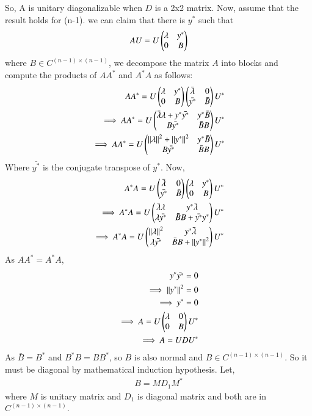\documentclass[journal,12pt,twocolumn]{IEEEtran}
\begin{document}
So, A is unitary diagonalizable when $D$ is a 2x2 matrix.
Now, assume that the result holds for (n-1). we can claim that there is $y^*$ such that 
\begin{align}
AU = U\begin{pmatrix}\lambda & y^*\\0 & B\end{pmatrix}
\end{align}
where $B \in C^{(n-1)\times(n-1)}$, we decompose the matrix $A$ into blocks and compute the products of $A A^*$ and $A^* A$ as follows:
\begin{align}
A A^* =  U \begin{pmatrix}\lambda & y^*\\0 & B\end{pmatrix}\begin{pmatrix}\bar{\lambda} & 0\\\bar{y^*} & \bar{B}\end{pmatrix}U^*\\
\implies A A^* =  U \begin{pmatrix}\bar{\lambda}\lambda + y^*\bar{y^*} & y^* \bar{B}\\B\bar{y^*} & \bar{B}B\end{pmatrix} U^*\\
\implies A A^* = U \begin{pmatrix}\left\lVert\lambda\right\rVert^2 + \left\lVert y^*\right\rVert^2 & y^* \bar{B}\\B\bar{y^*} & \bar{B}B\end{pmatrix} U^*
\end{align}
Where $\bar{y^*}$ is the conjugate transpose of $y^*$.
Now,
\begin{align}
A^* A = U \begin{pmatrix}\bar{\lambda} & 0\\\bar{y^*} & \bar{B}\end{pmatrix}\begin{pmatrix}\lambda & y^*\\0 & B\end{pmatrix}U^*\\
\implies A^* A =  U \begin{pmatrix}\bar{\lambda}\lambda & y^* \bar{\lambda}\\\lambda\bar{y^*} & \bar{B}B + \bar{y^*}y^*\end{pmatrix} U^*\\
\implies A^* A =U \begin{pmatrix}\left\lVert\lambda\right\rVert^2 & y^* \bar{\lambda}\\\lambda\bar{y^*} & \bar{B}B + \left\lVert y^*\right\rVert^2\end{pmatrix} U^*
\end{align}
As $A A^* = A^* A$, 
\begin{align}
y^* \bar{y^*} = 0\\
\implies \left\lVert y^*\right\rVert^2 = 0\\
\implies y^* =0\\
\implies A = U \begin{pmatrix}\lambda & 0\\0 & B\end{pmatrix} U^*\\
\implies A = U D U^*
\end{align}
As $\bar{B} = B^*$ and $B^* B = B B^*$, so $B$ is also normal and $B \in C^{(n-1)\times(n-1)}$. So it must be diagonal by mathematical induction hypothesis.
Let, 
\begin{align}
B = M D_1 M^*
\end{align}
where $M$ is unitary matrix and $D_1$ is diagonal matrix and both are in $C^{(n-1)\times(n-1)}$.
\end{document}
